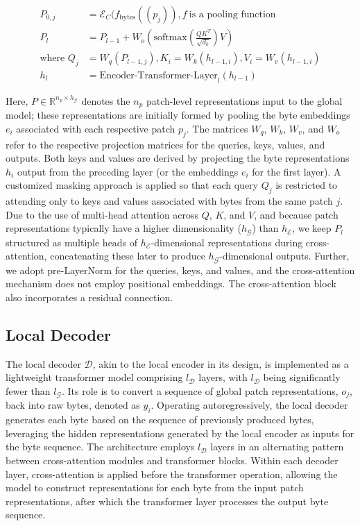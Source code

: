 \begin{align}
P_{0,j} &= \mathcal{E}_{C}(f_\text{bytes}((p_j)), f~ \text{is a pooling function} \\
P_l &= P_{l-1} + W_o\left(\text{softmax}\left(\frac{QK^T}{\sqrt{d_k}}\right)V\right) \\
\text{where } Q_j &= W_q(P_{l-1,j}), K_i = W_k(h_{l-1,i}), V_i = W_v(h_{l-1,i}) \\
h_l &= \text{Encoder-Transformer-Layer}_l(h_{l-1})
\end{align}

Here, $P \in \mathbb{R}^{n_p \times h_{\mathcal{G}}}$ denotes the $n_p$ patch-level representations input to the global model; these representations are initially formed by pooling the byte embeddings $e_i$ associated with each respective patch $p_j$. The matrices $W_q$, $W_k$, $W_v$, and $W_o$ refer to the respective projection matrices for the queries, keys, values, and outputs. Both keys and values are derived by projecting the byte representations $h_i$ output from the preceding layer (or the embeddings $e_i$ for the first layer). A customized masking approach is applied so that each query $Q_j$ is restricted to attending only to keys and values associated with bytes from the same patch $j$. Due to the use of multi-head attention across $Q$, $K$, and $V$, and because patch representations typically have a higher dimensionality ($h_{\mathcal{G}}$) than $h_{\mathcal{E}}$, we keep $P_l$ structured as multiple heads of $h_{\mathcal{E}}$-dimensional representations during cross-attention, concatenating these later to produce $h_{\mathcal{G}}$-dimensional outputs. Further, we adopt pre-LayerNorm for the queries, keys, and values, and the cross-attention mechanism does not employ positional embeddings. The cross-attention block also incorporates a residual connection.

\subsection{Local Decoder} 

The local decoder $\mathcal{D}$, akin to the local encoder in its design, is implemented as a lightweight transformer model comprising $l_{\mathcal{D}}$ layers, with $l_{\mathcal{D}}$ being significantly fewer than $l_{\mathcal{G}}$. Its role is to convert a sequence of global patch representations, $o_j$, back into raw bytes, denoted as $y_i$. Operating autoregressively, the local decoder generates each byte based on the sequence of previously produced bytes, leveraging the hidden representations generated by the local encoder as inputs for the byte sequence. The architecture employs $l_{\mathcal{D}}$ layers in an alternating pattern between cross-attention modules and transformer blocks. Within each decoder layer, cross-attention is applied before the transformer operation, allowing the model to construct representations for each byte from the input patch representations, after which the transformer layer processes the output byte sequence.

